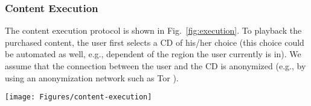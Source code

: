 \documentclass{llncs}
\newcommand{\refFig}[1]{Fig.~\ref{#1}}
\begin{document}
\subsubsection{Content Execution} \label{content_execution}

The content execution protocol is shown in \refFig{fig:execution}. To playback the purchased content, the user first selects a CD of his/her choice (this choice could be automated as well, e.g., dependent of the region the user currently is in). We assume that the connection between the user and the CD is anonymized (e.g., by using an anonymization network such as Tor \cite{tor}).

\begin{figure*}[ht]
	\centering
	\texttt{[image: Figures/content-execution]}
	\caption{Content execution protocol.}
	\label{fig:execution}
\end{figure*} 
\end{document}
